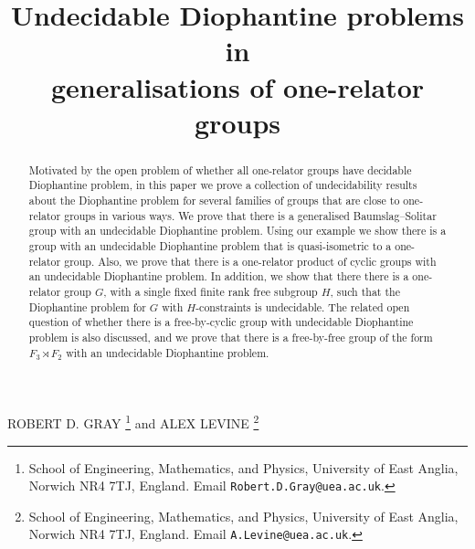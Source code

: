 \documentclass[11pt]{amsart}
\title[Undecidable Diophantine problems]{Undecidable Diophantine problems in \\ generalisations of one-relator groups}
\theoremstyle{definition}
\numberwithin{theorem}{section}
\begin{document}
\maketitle

\vspace{-4mm}

\begin{center}
 ROBERT D. GRAY
 \footnote{School of Engineering, Mathematics, and Physics, 
University of East Anglia, Norwich NR4 7TJ, England.
 Email \texttt{Robert.D.Gray@uea.ac.uk}.
 }
 and
 ALEX LEVINE
 \footnote{School of Engineering, Mathematics, and Physics, University of 
East Anglia, Norwich NR4 7TJ, England.
 Email \texttt{A.Levine@uea.ac.uk}.
 }
\end{center}

\vspace{-4mm}

\begin{abstract}
Motivated by the 
open problem of whether all one-relator groups have decidable Diophantine problem,
in this paper we prove a collection of undecidability results about the Diophantine problem for several families of groups that are close to one-relator groups in various ways. We prove that there is a generalised Baumslag--Solitar group with an undecidable Diophantine problem.  Using our example we show there is a group with an undecidable Diophantine problem that is quasi-isometric to a one-relator group. Also, we prove that there is a one-relator product of cyclic groups with an undecidable Diophantine problem. In addition, we show that there there is a one-relator group $G$, with a single fixed finite rank free subgroup $H$, such that the Diophantine problem for $G$ with $H$-constraints is undecidable. The related open question of whether there is a free-by-cyclic group with undecidable Diophantine problem is also discussed, and we prove that there is a free-by-free group of the form  $F_3 \rtimes F_2$ with an undecidable Diophantine problem.
\end{abstract}
\end{document}
